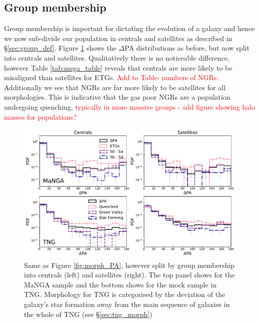 \documentclass[fleqn,usenatbib]{mnras}
\newcommand{\red}[1]{{\textcolor{red}{#1}}}
\begin{document}
\subsection{Group membership}
Group membership is important for dictating the evolution of a galaxy and hence we now sub-divide our population in centrals and satellites as described in \S\ref{sec:group_def}. Figure \ref{fig:group_morph_PA} shows the $\Delta$PA distributions as before, but now split into centrals and satellites. Qualitatively there is no noticeable difference, however Table \ref{tab:mega_table} reveals that centrals are more likely to be misaligned than satellites for ETGs. \red{Add to Table: numbers of NGRs.} Additionally we see that NGRs are far more likely to be satellites for all morphologies. This is indicative that the gas poor NGRs are a population undergoing quenching, \red{typically in more massive groups - add figure showing halo masses for populations?}

\begin{figure}
	\includegraphics[width=\linewidth]{total_pop/MPL8_TNG_morph_group_PA.pdf}
    \caption{Same as Figure \ref{fig:morph_PA}, however split by group membership into centrals (left) and satellites (right). The top panel shows for the MaNGA sample and the bottom shows for the mock sample in TNG. Morphology for TNG is categorised by the deviation of the galaxy's star formation away from the main sequence of galaxies in the whole of TNG (see \S\ref{sec:tng_morph})}
    \label{fig:group_morph_PA}
\end{figure}
\end{document}
